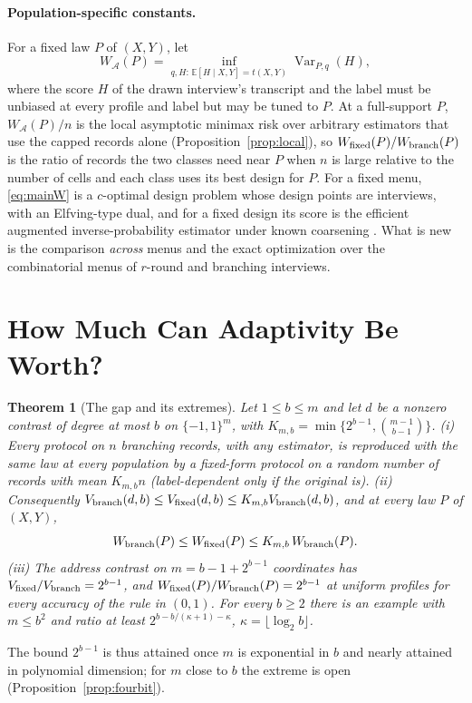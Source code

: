\documentclass{article}
\newtheorem{theorem}{Theorem}
\newcommand{\E}{\mathbb{E}}
\newcommand{\Var}{\operatorname{Var}}
\newcommand{\A}{\mathcal A}
\begin{document}
\paragraph{Population-specific constants.}
For a fixed law $P$ of $(X,Y)$, let
\begin{equation}
 W_{\A}(P)=\inf_{q,H:\,\E[H\mid X,Y]=t(X,Y)}\Var_{P,q}(H),\label{eq:mainW}
\end{equation}
where the score $H$ of the drawn interview's transcript and the label must be unbiased at every profile and label but may be tuned to $P$. At a full-support $P$, $W_\A(P)/n$ is the local asymptotic minimax risk over arbitrary estimators that use the capped records alone (Proposition~\ref{prop:local}), so $W_{\rm fixed}(P)/W_{\rm branch}(P)$ is the ratio of records the two classes need near $P$ when $n$ is large relative to the number of cells and each class uses its best design for $P$. For a fixed menu, \eqref{eq:mainW} is a $c$-optimal design problem whose design points are interviews, with an Elfving-type dual, and for a fixed design its score is the efficient augmented inverse-probability estimator under known coarsening \citep{elfving1952,pukelsheim1993,robins1994,tsiatis2006}. What is new is the comparison \emph{across} menus and the exact optimization over the combinatorial menus of $r$-round and branching interviews.

\section{How Much Can Adaptivity Be Worth?}\label{sec:gap}
\begin{theorem}[The gap and its extremes]\label{thm:universal}
Let $1\le b\le m$ and let $d$ be a nonzero contrast of degree at most $b$ on $\{-1,1\}^m$, with $K_{m,b}=\min\{2^{b-1},\binom{m-1}{b-1}\}$.
\textup{(i)} Every protocol on $n$ branching records, with any estimator, is reproduced with the same law at every population by a fixed-form protocol on a random number of records with mean $K_{m,b}n$ (label-dependent only if the original is).
\textup{(ii)} Consequently $V_{\rm branch}(d,b)\le V_{\rm fixed}(d,b)\le K_{m,b}V_{\rm branch}(d,b)$, and at every law $P$ of $(X,Y)$,
\begin{equation}
 W_{\rm branch}(P)\le W_{\rm fixed}(P)\le K_{m,b}\,W_{\rm branch}(P).\label{eq:universal}
\end{equation}
\textup{(iii)} The address contrast on $m=b-1+2^{b-1}$ coordinates has $V_{\rm fixed}/V_{\rm branch}=2^{b-1}$, and $W_{\rm fixed}(P)/W_{\rm branch}(P)=2^{b-1}$ at uniform profiles for every accuracy of the rule in $(0,1)$. For every $b\ge2$ there is an example with $m\le b^2$ and ratio at least $2^{b-b/(\kappa+1)-\kappa}$, $\kappa=\lfloor\log_2 b\rfloor$.
\end{theorem}
The bound $2^{b-1}$ is thus attained once $m$ is exponential in $b$ and nearly attained in polynomial dimension; for $m$ close to $b$ the extreme is open (Proposition~\ref{prop:fourbit}).
\end{document}

